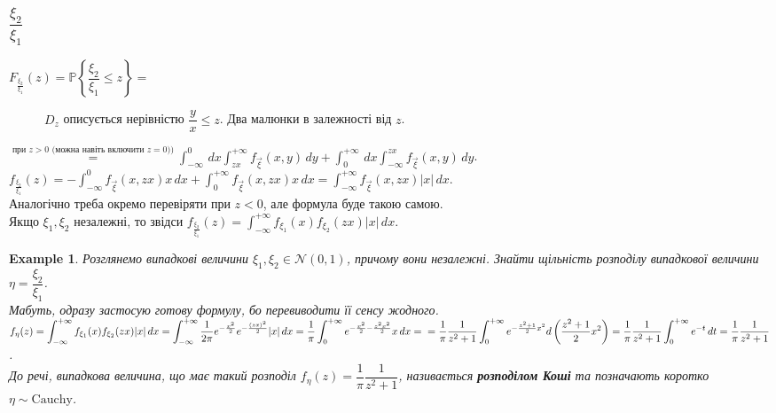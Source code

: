 \documentclass[a4paper, 10pt]{article}
\theoremstyle{theoremdd}
\newtheorem{example}[theorem]{Example}
\begin{document}
\subsubsection{$\dfrac{\xi_2}{\xi_1}$}
$F_{\frac{\xi_2}{\xi_1}}(z) = \mathbb{P}\left\{ \dfrac{\xi_2}{\xi_1} \leq z \right\} =$
\begin{figure}[H]
\centering
{}
\qquad
{}
\caption*{$D_z$ описується нерівністю $\dfrac{y}{x} \leq z$. Два малюнки в залежності від $z$.}
\end{figure}
\noindent $\overset{\text{при $z>0$ (можна навіть включити $z = 0$))}}{=} \displaystyle\int_{-\infty}^0\,dx \int_{zx}^{+\infty} f_{\vec{\xi}}(x,y)\,dy + \int_0^{+\infty}\,dx\int_{-\infty}^{zx} f_{\vec{\xi}}(x,y)\,dy$.\\
$f_{\frac{\xi_2}{\xi_1}}(z) = -\displaystyle\int_{-\infty}^0 f_{\vec{\xi}}(x,zx)x\,dx + \int_0^{+\infty} f_{\vec{\xi}}(x,zx)x\,dx = \int_{-\infty}^{+\infty} f_{\vec{\xi}}(x,zx) |x|\,dx$.\\
Аналогічно треба окремо перевіряти при $z < 0$, але формула буде такою самою.\\
Якщо $\xi_1,\xi_2$ незалежні, то звідси $f_{\frac{\xi_2}{\xi_1}}(z) = \displaystyle\int_{-\infty}^{+\infty} f_{\xi_1}(x) f_{\xi_2}(zx) |x|\,dx$.

\begin{example}
Розглянемо випадкові величини $\xi_1,\xi_2 \in \mathcal{N}(0,1)$, причому вони незалежні. Знайти щільність розподілу випадкової величини $\eta = \dfrac{\xi_2}{\xi_1}$.\\
Мабуть, одразу застосую готову формулу, бо перевиводити її сенсу жодного.\\
$f_{\eta}(z) = \displaystyle\int_{-\infty}^{+\infty} f_{\xi_1}(x) f_{\xi_2}(zx) |x|\,dx = \int_{-\infty}^{+\infty} \dfrac{1}{2\pi} e^{-\frac{x^2}{2}} e^{-\frac{(zx)^2}{2}}|x|\,dx = \dfrac{1}{\pi} \int_0^{+\infty} e^{-\frac{x^2}{2} - \frac{z^2x^2}{2}} x\,dx = \\
= \dfrac{1}{\pi} \dfrac{1}{z^2+1} \int_0^{+\infty} e^{-\frac{z^2+1}{2}x^2} d\left( \dfrac{z^2+1}{2}x^2 \right) = \dfrac{1}{\pi} \dfrac{1}{z^2+1} \int_0^{+\infty} e^{-t}\,dt = \dfrac{1}{\pi} \dfrac{1}{z^2+1}$.\\
До речі, випадкова величина, що має такий розподіл $f_{\eta}(z) = \dfrac{1}{\pi} \dfrac{1}{z^2+1}$, називається \textbf{розподілом Коші} та позначають коротко $\eta \sim \text{Cauchy}$.
\end{example}
\end{document}
